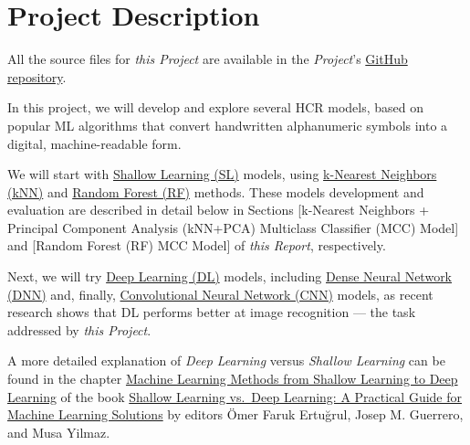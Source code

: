 \documentclass[
]{report}
\begin{document}
\section{Project Description}\label{project-description}

\begin{noteblock}
All the source files for \emph{this Project} are available in the \emph{Project}'s \href{https://github.com/AzKurban-edX-DS/edx.capstone.choose-your-own}{GitHub repository}\autocite{edx.Capstone_CYO}.

\end{noteblock}

In this project, we will develop and explore several HCR models, based on popular ML algorithms that convert handwritten alphanumeric symbols into a digital, machine-readable form.

We will start with \href{https://soulpageit.com/ai-glossary/shallow-learning-explained/}{Shallow Learning (SL)} models, using \href{https://rafalab.dfci.harvard.edu/dsbook-part-2/ml/resampling-methods.html\#sec-knn-cv-intro}{k-Nearest Neighbors (kNN)} and \href{https://rafalab.dfci.harvard.edu/dsbook-part-2/ml/algorithms.html\#sec-random-forests}{Random Forest (RF)} methods. These models development and evaluation are described in detail below in Sections {[}k-Nearest Neighbors + Principal Component Analysis (kNN+PCA) Multiclass Classifier (MCC) Model{]} and {[}Random Forest (RF) MCC Model{]} of \emph{this Report}, respectively.

Next, we will try \href{https://soulpageit.com/ai-glossary/deep-learning-explained/}{Deep Learning (DL)} models, including \href{https://smltar.com/dldnn}{Dense Neural Network (DNN)} and, finally, \href{https://smltar.com/dlcnn\#what-are-cnns}{Convolutional Neural Network (CNN)} models, as recent research shows that DL performs better at image recognition --- the task addressed by \emph{this Project}.

A more detailed explanation of \emph{Deep Learning} versus \emph{Shallow Learning} can be found in the chapter \href{https://link.springer.com/chapter/10.1007/978-3-031-69499-8_1?status=info&saved-doi=10.1007\%2F978-3-031-69499-8_1}{Machine Learning Methods from Shallow Learning to Deep Learning} of the book \href{https://link.springer.com/book/10.1007/978-3-031-69499-8?status=info&saved-doi=10.1007\%2F978-3-031-69499-8}{Shallow Learning vs.~Deep Learning: A Practical Guide for Machine Learning Solutions} by editors Ömer Faruk Ertuğrul, Josep M. Guerrero, and Musa Yilmaz\autocite{Akinci2024}.
\end{document}
